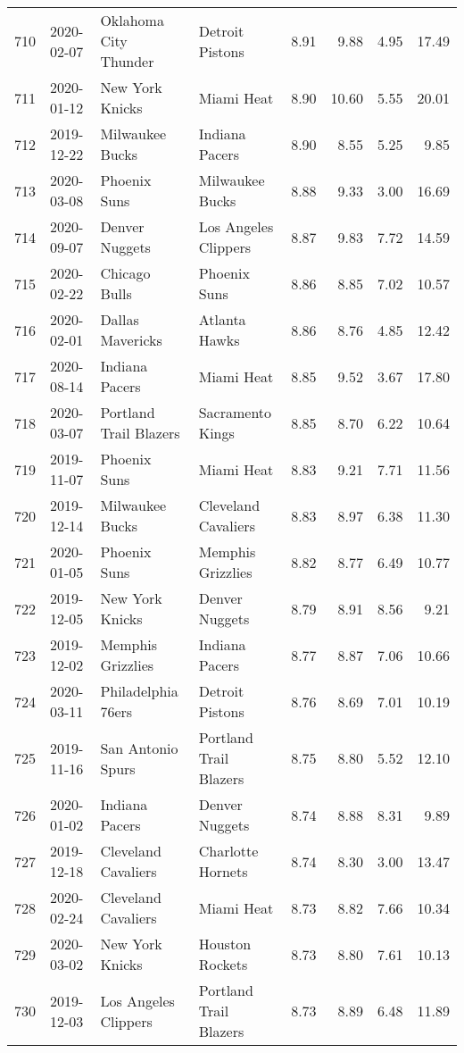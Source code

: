 \documentclass[
  11pt,
]{article}
\theoremstyle{nonumberplain}
\begin{document}
\begin{longtable}{rl|llr|rrr}
710 & 2020-02-07 & Oklahoma City Thunder & Detroit Pistons & 8.91 & 9.88 & 4.95 & 17.49\\
711 & 2020-01-12 & New York Knicks & Miami Heat & 8.90 & 10.60 & 5.55 & 20.01\\
712 & 2019-12-22 & Milwaukee Bucks & Indiana Pacers & 8.90 & 8.55 & 5.25 & 9.85\\
713 & 2020-03-08 & Phoenix Suns & Milwaukee Bucks & 8.88 & 9.33 & 3.00 & 16.69\\
714 & 2020-09-07 & Denver Nuggets & Los Angeles Clippers & 8.87 & 9.83 & 7.72 & 14.59\\
715 & 2020-02-22 & Chicago Bulls & Phoenix Suns & 8.86 & 8.85 & 7.02 & 10.57\\
716 & 2020-02-01 & Dallas Mavericks & Atlanta Hawks & 8.86 & 8.76 & 4.85 & 12.42\\
717 & 2020-08-14 & Indiana Pacers & Miami Heat & 8.85 & 9.52 & 3.67 & 17.80\\
718 & 2020-03-07 & Portland Trail Blazers & Sacramento Kings & 8.85 & 8.70 & 6.22 & 10.64\\
719 & 2019-11-07 & Phoenix Suns & Miami Heat & 8.83 & 9.21 & 7.71 & 11.56\\
720 & 2019-12-14 & Milwaukee Bucks & Cleveland Cavaliers & 8.83 & 8.97 & 6.38 & 11.30\\
721 & 2020-01-05 & Phoenix Suns & Memphis Grizzlies & 8.82 & 8.77 & 6.49 & 10.77\\
722 & 2019-12-05 & New York Knicks & Denver Nuggets & 8.79 & 8.91 & 8.56 & 9.21\\
723 & 2019-12-02 & Memphis Grizzlies & Indiana Pacers & 8.77 & 8.87 & 7.06 & 10.66\\
724 & 2020-03-11 & Philadelphia 76ers & Detroit Pistons & 8.76 & 8.69 & 7.01 & 10.19\\
725 & 2019-11-16 & San Antonio Spurs & Portland Trail Blazers & 8.75 & 8.80 & 5.52 & 12.10\\
726 & 2020-01-02 & Indiana Pacers & Denver Nuggets & 8.74 & 8.88 & 8.31 & 9.89\\
727 & 2019-12-18 & Cleveland Cavaliers & Charlotte Hornets & 8.74 & 8.30 & 3.00 & 13.47\\
728 & 2020-02-24 & Cleveland Cavaliers & Miami Heat & 8.73 & 8.82 & 7.66 & 10.34\\
729 & 2020-03-02 & New York Knicks & Houston Rockets & 8.73 & 8.80 & 7.61 & 10.13\\
730 & 2019-12-03 & Los Angeles Clippers & Portland Trail Blazers & 8.73 & 8.89 & 6.48 & 11.89\\

\end{longtable}
\end{document}
